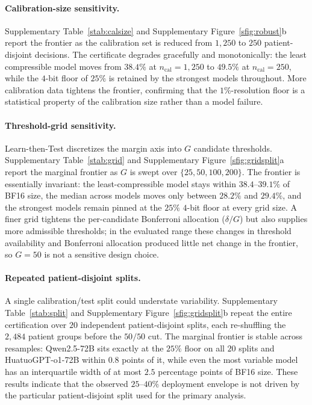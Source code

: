 \documentclass[11pt]{article}
\theoremstyle{plain}
\begin{document}
\paragraph{Calibration-size sensitivity.} Supplementary Table~\ref{stab:calsize} and Supplementary
Figure~\ref{sfig:robust}b report the frontier as the calibration set is reduced from $1{,}250$ to
$250$ patient-disjoint decisions. The certificate degrades gracefully and monotonically: the least
compressible model moves from $38.4\%$ at $n_{\mathrm{cal}}=1{,}250$ to $49.5\%$ at
$n_{\mathrm{cal}}=250$, while the $4$-bit floor of $25\%$ is retained by the strongest models
throughout. More calibration data tightens the frontier, confirming that the $1\%$-resolution floor
is a statistical property of the calibration size rather than a model failure.

\paragraph{Threshold-grid sensitivity.} Learn-then-Test discretizes the margin axis into $G$ candidate
thresholds. Supplementary Table~\ref{stab:grid} and Supplementary Figure~\ref{sfig:gridsplit}a report
the marginal frontier as $G$ is swept over $\{25,50,100,200\}$. The frontier is essentially invariant:
the least-compressible model stays within $38.4$--$39.1\%$ of BF16 size, the median across models moves
only between $28.2\%$ and $29.4\%$, and the strongest models remain pinned at the $25\%$ $4$-bit floor
at every grid size. A finer grid tightens the per-candidate Bonferroni allocation ($\delta/G$) but also
supplies more admissible thresholds; in the evaluated range these changes in threshold availability and
Bonferroni allocation produced little net change in the frontier, so $G=50$ is not a sensitive design
choice.

\paragraph{Repeated patient-disjoint splits.} A single calibration/test split could understate
variability. Supplementary Table~\ref{stab:split} and Supplementary Figure~\ref{sfig:gridsplit}b repeat
the entire certification over $20$ independent patient-disjoint splits, each re-shuffling the $2{,}484$
patient groups before the $50/50$ cut. The marginal frontier is stable across resamples: Qwen2.5-72B
sits exactly at the $25\%$ floor on all $20$ splits and HuatuoGPT-o1-72B within $0.8$ points of it,
while even the most variable model has an interquartile width of at most $2.5$ percentage points of
BF16 size. These results indicate that the observed $25$--$40\%$ deployment envelope is not driven by
the particular patient-disjoint split used for the primary analysis.
\end{document}
